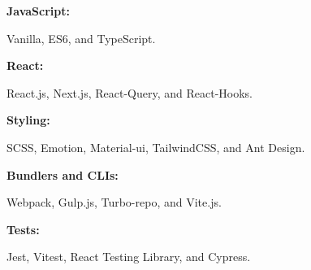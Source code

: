 \documentclass[9pt]{developercv} %
\begin{document}
    \begin{minipage}[t]{0.465\textwidth}
        \vspace{-6pt}

        \begin{minipage}[t]{0.2\textwidth}
            \textbf{JavaScript:}
        \end{minipage}
        \hfill
        \begin{minipage}[t]{0.73\textwidth}
            Vanilla, ES6, and TypeScript.
        \end{minipage}
        \vspace{4mm}

        \begin{minipage}[t]{0.2\textwidth}
            \textbf{React:}
        \end{minipage}
        \hfill
        \begin{minipage}[t]{0.73\textwidth}
            React.js, Next.js, React-Query, and React-Hooks.
        \end{minipage}
        \vspace{4mm}

        \begin{minipage}[t]{0.2\textwidth}
            \textbf{Styling:}
        \end{minipage}
        \hfill
        \begin{minipage}[t]{0.73\textwidth}
            SCSS, Emotion, Material-ui, TailwindCSS, and Ant Design.
        \end{minipage}
        \vspace{4mm}

        \begin{minipage}[t]{0.2\textwidth}
            \textbf{Bundlers and CLIs:}
        \end{minipage}
        \hfill
        \begin{minipage}[t]{0.73\textwidth}
            Webpack, Gulp.js, Turbo-repo, and Vite.js.
        \end{minipage}
        \vspace{4mm}

        \begin{minipage}[t]{0.2\textwidth}
            \textbf{Tests:}
        \end{minipage}
        \hfill
        \begin{minipage}[t]{0.73\textwidth}
            Jest, Vitest, React Testing Library, and Cypress.
        \end{minipage}
        \vspace{4mm}


\end{minipage}
\end{document}
